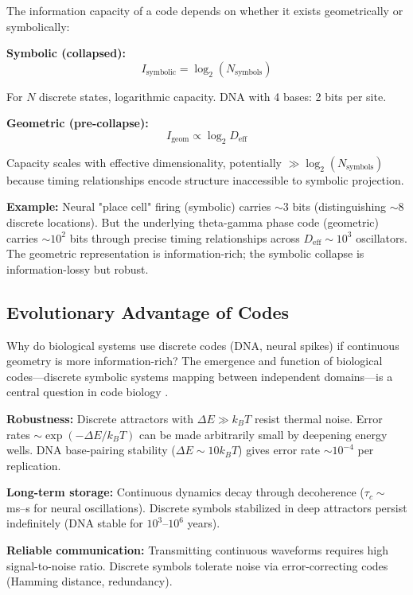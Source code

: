 \documentclass[12pt]{article}
\begin{document}
The information capacity of a code depends on whether it exists geometrically or symbolically:

\textbf{Symbolic (collapsed):}
\begin{equation}
I_{\text{symbolic}} = \log_2(N_{\text{symbols}})
\end{equation}

For $N$ discrete states, logarithmic capacity. DNA with 4 bases: 2 bits per site.

\textbf{Geometric (pre-collapse):}
\begin{equation}
I_{\text{geom}} \propto \log_2 D_{\text{eff}}
\end{equation}

Capacity scales with effective dimensionality, potentially $\gg \log_2(N_{\text{symbols}})$ because timing relationships encode structure inaccessible to symbolic projection.

\textbf{Example:} Neural "place cell" firing (symbolic) carries $\sim 3$ bits (distinguishing $\sim 8$ discrete locations). But the underlying theta-gamma phase code (geometric) carries $\sim 10^2$ bits through precise timing relationships across $D_{\text{eff}} \sim 10^3$ oscillators. The geometric representation is information-rich; the symbolic collapse is information-lossy but robust.

\subsection{Evolutionary Advantage of Codes}

Why do biological systems use discrete codes (DNA, neural spikes) if continuous geometry is more information-rich? The emergence and function of biological codes—discrete symbolic systems mapping between independent domains—is a central question in code biology \cite{barbieri2018}.

\textbf{Robustness:} Discrete attractors with $\Delta E \gg k_B T$ resist thermal noise. Error rates $\sim \exp(-\Delta E/k_B T)$ can be made arbitrarily small by deepening energy wells. DNA base-pairing stability ($\Delta E \sim 10 k_B T$) gives error rate $\sim 10^{-4}$ per replication.

\textbf{Long-term storage:} Continuous dynamics decay through decoherence ($\tau_c \sim$ ms--s for neural oscillations). Discrete symbols stabilized in deep attractors persist indefinitely (DNA stable for $10^3$--$10^6$ years).

\textbf{Reliable communication:} Transmitting continuous waveforms requires high signal-to-noise ratio. Discrete symbols tolerate noise via error-correcting codes (Hamming distance, redundancy).
\end{document}
